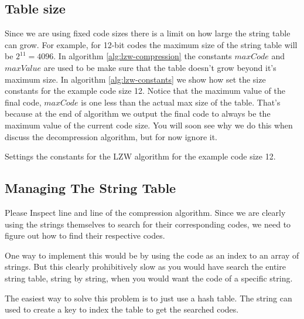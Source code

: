 \begin{refsection}
\subsection{Table size}

Since we are using fixed code sizes there is a limit on how large the
string table can grow. For example, for 12-bit codes the maximum size
of the string table will be $2^{11}=4096$. In algorithm
\ref{alg:lzw-compression} the constants $maxCode$ and $maxValue$ are
used to be make sure that the table doesn't grow beyond it's maximum
size. In algorithm \ref{alg:lzw-constants} we show how set the size
constants for the example code size 12. Notice that the maximum value
of the final code, $maxCode$ is one less than the actual max size of
the table. That's because at the end of algorithm we output the final
code to always be the maximum value of the current code size. You will
soon see why we do this when discuss the decompression algorithm, but for
now ignore it.

\begin{algorithm}[H]
  \caption{Settings the constants for the LZW algorithm for the
    example code size 12.}
  \label{alg:lzw-constants}
  \begin{algorithmic}[1]
  \end{algorithmic}
\end{algorithm}

\subsection{Managing The String Table}

Please Inspect line
 and line
 of the compression
algorithm. Since we are clearly using the strings themselves to search
for their corresponding codes, we need to figure out how to find their
respective codes.

One way to implement this would be by using the code as an index to an
array of strings. But this clearly prohibitively slow as you would
have search the entire string table, string by string, when you would
want the code of a specific string.

The easiest way to solve this problem is to just use a hash table. The
string can used to create a key to index the table to get the searched
codes.


\end{refsection}
